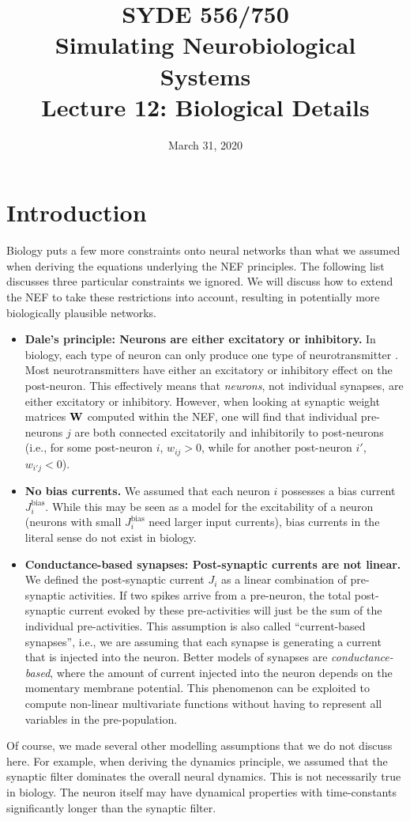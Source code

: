 \documentclass[10pt,letterpaper,oneside]{article}
\date{March 31, 2020}
\title{SYDE 556/750 \\ Simulating Neurobiological Systems \\ Lecture 12: Biological Details}
\begin{document}

\section{Introduction}


Biology puts a few more constraints onto neural networks than what we assumed when deriving the equations underlying the NEF principles. The following list discusses three particular constraints we ignored. We will discuss how to extend the NEF to take these restrictions into account, resulting in potentially more biologically plausible networks.
\begin{itemize}
	\item \textbf{Dale's principle: Neurons are either excitatory or inhibitory.} In biology, each type of neuron can only produce one type of neurotransmitter \cite{strata1999dale}. Most neurotransmitters have either an excitatory or inhibitory effect on the post-neuron. This effectively means that \emph{neurons}, not individual synapses, are either excitatory or inhibitory. However, when looking at synaptic weight matrices ${\mathbf{W}}$ computed within the NEF, one will find that individual pre-neurons $j$ are both connected excitatorily  and inhibitorily to post-neurons (i.e., for some post-neuron $i$, $w_{ij} > 0$, while for another post-neuron $i'$, $w_{i'j} < 0$).
	\item \textbf{No bias currents.} We assumed that each neuron $i$ possesses a bias current $J^\mathrm{bias}_i$. While this may be seen as a model for the excitability of a neuron (neurons with small $J^\mathrm{bias}_i$ need larger input currents), bias currents in the literal sense do not exist in biology.
	\item \textbf{Conductance-based synapses: Post-synaptic currents are not linear.} We defined the post-synaptic current $J_i$ as a linear combination of pre-synaptic activities. If two spikes arrive from a pre-neuron, the total post-synaptic current evoked by these pre-activities will just be the sum of the individual pre-activities. This assumption is also called \enquote{current-based synapses}, i.e., we are assuming that each synapse is generating a current that is injected into the neuron. Better models of synapses are \emph{conductance-based}, where the amount of current injected into the neuron depends on the momentary membrane potential. This phenomenon can be exploited to compute non-linear multivariate functions without having to represent all variables in the pre-population.
\end{itemize}
Of course, we made several other modelling assumptions that we do not discuss here. For example, when deriving the dynamics principle, we assumed that the synaptic filter dominates the overall neural dynamics. This is not necessarily true in biology. The neuron itself may have dynamical properties with time-constants significantly longer than the synaptic filter.
\end{document}
